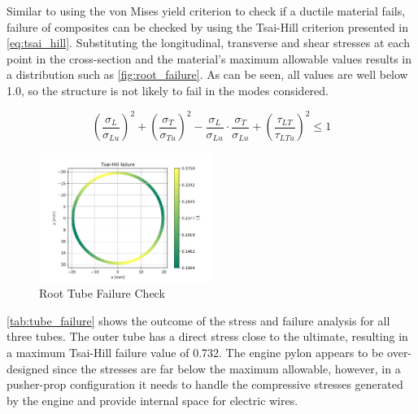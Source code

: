 Similar to using the von Mises yield criterion to check if a ductile material fails, failure of composites can be checked by using the Tsai-Hill criterion \cite{pure_evil} presented in \autoref{eq:tsai_hill}. Substituting the longitudinal, transverse and shear stresses at each point in the cross-section and the material's maximum allowable values results in a distribution such as \autoref{fig:root_failure}. As can be seen, all values are well below 1.0, so the structure is not likely to fail in the modes considered.  

\begin{equation}
\label{eq:tsai_hill}
    {\left( {\frac{{{\sigma _L}}}{{{\sigma _{Lu}}}}} \right)^2} + {\left( {\frac{{{\sigma _T}}}{{{\sigma _{Tu}}}}} \right)^2} - \frac{{{\sigma _L}}}{{{\sigma _{Lu}}}} \cdot \frac{{{\sigma _T}}}{{{\sigma _{Lu}}}} + {\left( {\frac{{{\tau _{LT}}}}{{{\tau _{LTu}}}}} \right)^2} \leqslant 1
\end{equation}

\begin{figure}[H]
    \centering
    \includegraphics[width=0.5\textwidth]{Structures/Figures/root_failure}
    \caption{Root Tube Failure Check}
    \label{fig:root_failure}
\end{figure}

\autoref{tab:tube_failure} shows the outcome of the stress and failure analysis for all three tubes. The outer tube has a direct stress close to the ultimate, resulting in a maximum Tsai-Hill failure value of 0.732. The engine pylon appears to be over-designed since the stresses are far below the maximum allowable, however, in a pusher-prop configuration it needs to handle the compressive stresses generated by the engine and provide internal space for electric wires.  


